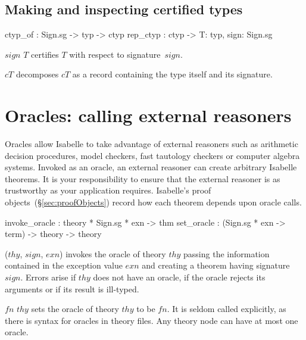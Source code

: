 \subsection{Making and inspecting certified types}
\begin{ttbox}
ctyp_of  : Sign.sg -> typ -> ctyp
rep_ctyp : ctyp -> {\ttlbrace}T: typ, sign: Sign.sg\ttrbrace
\end{ttbox}
\begin{ttdescription}
\item[\ttindexbold{ctyp_of} $sign$ $T$] 
certifies $T$ with respect to signature~$sign$.

\item[\ttindexbold{rep_ctyp} $cT$]
decomposes $cT$ as a record containing the type itself and its signature.
\end{ttdescription}


\section{Oracles: calling external reasoners }
\label{sec:oracles}

Oracles allow Isabelle to take advantage of external reasoners such as
arithmetic decision procedures, model checkers, fast tautology checkers or
computer algebra systems.  Invoked as an oracle, an external reasoner can
create arbitrary Isabelle theorems.  It is your responsibility to ensure that
the external reasoner is as trustworthy as your application requires.
Isabelle's proof objects~(\S\ref{sec:proofObjects}) record how each theorem
depends upon oracle calls.

\begin{ttbox}
     invoke_oracle : theory * Sign.sg * exn -> thm
     set_oracle    : (Sign.sg * exn -> term) -> theory -> theory
\end{ttbox}
\begin{ttdescription}
\item[\ttindexbold{invoke_oracle} ($thy$, $sign$, $exn$)] invokes the oracle
  of theory $thy$ passing the information contained in the exception value
  $exn$ and creating a theorem having signature $sign$.  Errors arise if $thy$
  does not have an oracle, if the oracle rejects its arguments or if its
  result is ill-typed.

\item[\ttindexbold{set_oracle} $fn$ $thy$] sets the oracle of theory $thy$ to
  be $fn$.  It is seldom called explicitly, as there is syntax for oracles in
  theory files.  Any theory node can have at most one oracle.
\end{ttdescription}

